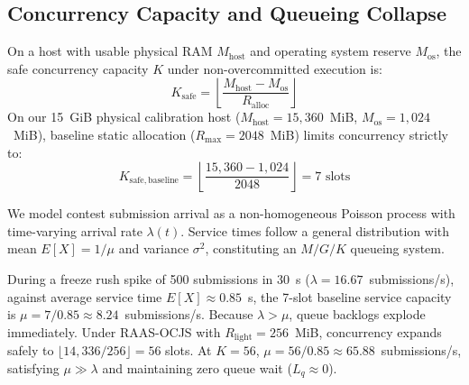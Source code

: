 \documentclass[conference]{IEEEtran}
\begin{document}
\subsection{Concurrency Capacity and Queueing Collapse}
On a host with usable physical RAM $M_{\mathrm{host}}$ and operating system reserve $M_{\mathrm{os}}$, the safe concurrency capacity $K$ under non-overcommitted execution is:
\begin{equation}
K_{\mathrm{safe}} = \left\lfloor \frac{M_{\mathrm{host}} - M_{\mathrm{os}}}{R_{\mathrm{alloc}}} \right\rfloor
\end{equation}
On our 15~GiB physical calibration host ($M_{\mathrm{host}} = 15,360$~MiB, $M_{\mathrm{os}} = 1,024$~MiB), baseline static allocation ($R_{\mathrm{max}} = 2048$~MiB) limits concurrency strictly to:
\begin{equation}
K_{\mathrm{safe, baseline}} = \left\lfloor \frac{15,360 - 1,024}{2048} \right\rfloor = 7 \text{ slots}
\end{equation}

We model contest submission arrival as a non-homogeneous Poisson process with time-varying arrival rate $\lambda(t)$. Service times follow a general distribution with mean $E[X] = 1/\mu$ and variance $\sigma^2$, constituting an $M/G/K$ queueing system.

During a freeze rush spike of 500 submissions in 30~s ($\lambda = 16.67$~submissions/s), against average service time $E[X] \approx 0.85$~s, the 7-slot baseline service capacity is $\mu = 7 / 0.85 \approx 8.24$~submissions/s. Because $\lambda > \mu$, queue backlogs explode immediately. Under RAAS-OCJS with $R_{\mathrm{light}} = 256$~MiB, concurrency expands safely to $\lfloor 14{,}336/256 \rfloor = 56$ slots. At $K = 56$, $\mu = 56 / 0.85 \approx 65.88$~submissions/s, satisfying $\mu \gg \lambda$ and maintaining zero queue wait ($L_q \approx 0$).
\end{document}
